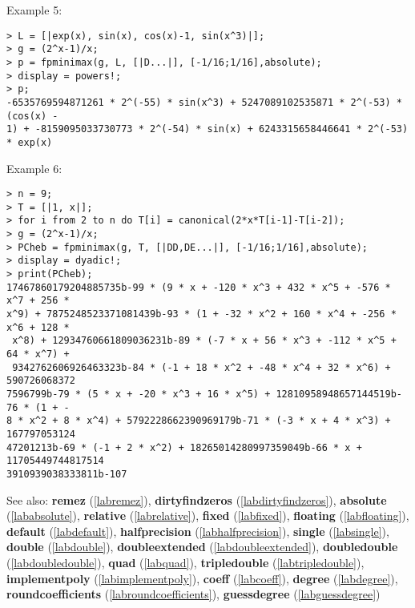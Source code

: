 \noindent Example 5: 
\begin{center}\begin{minipage}{15cm}\begin{Verbatim}[frame=single]
> L = [|exp(x), sin(x), cos(x)-1, sin(x^3)|];
> g = (2^x-1)/x;
> p = fpminimax(g, L, [|D...|], [-1/16;1/16],absolute);
> display = powers!;
> p;
-6535769594871261 * 2^(-55) * sin(x^3) + 5247089102535871 * 2^(-53) * (cos(x) - 
1) + -8159095033730773 * 2^(-54) * sin(x) + 6243315658446641 * 2^(-53) * exp(x)
\end{Verbatim}
\end{minipage}\end{center}
\noindent Example 6: 
\begin{center}\begin{minipage}{15cm}\begin{Verbatim}[frame=single]
> n = 9;
> T = [|1, x|];
> for i from 2 to n do T[i] = canonical(2*x*T[i-1]-T[i-2]);
> g = (2^x-1)/x;
> PCheb = fpminimax(g, T, [|DD,DE...|], [-1/16;1/16],absolute);
> display = dyadic!;
> print(PCheb);
17467860179204885735b-99 * (9 * x + -120 * x^3 + 432 * x^5 + -576 * x^7 + 256 * 
x^9) + 7875248523371081439b-93 * (1 + -32 * x^2 + 160 * x^4 + -256 * x^6 + 128 *
 x^8) + 12934760661809036231b-89 * (-7 * x + 56 * x^3 + -112 * x^5 + 64 * x^7) +
 9342762606926463323b-84 * (-1 + 18 * x^2 + -48 * x^4 + 32 * x^6) + 590726068372
7596799b-79 * (5 * x + -20 * x^3 + 16 * x^5) + 12810958948657144519b-76 * (1 + -
8 * x^2 + 8 * x^4) + 5792228662390969179b-71 * (-3 * x + 4 * x^3) + 167797053124
47201213b-69 * (-1 + 2 * x^2) + 18265014280997359049b-66 * x + 11705449744817514
3910939038333811b-107
\end{Verbatim}
\end{minipage}\end{center}
See also: \textbf{remez} (\ref{labremez}), \textbf{dirtyfindzeros} (\ref{labdirtyfindzeros}), \textbf{absolute} (\ref{lababsolute}), \textbf{relative} (\ref{labrelative}), \textbf{fixed} (\ref{labfixed}), \textbf{floating} (\ref{labfloating}), \textbf{default} (\ref{labdefault}), \textbf{halfprecision} (\ref{labhalfprecision}), \textbf{single} (\ref{labsingle}), \textbf{double} (\ref{labdouble}), \textbf{doubleextended} (\ref{labdoubleextended}), \textbf{doubledouble} (\ref{labdoubledouble}), \textbf{quad} (\ref{labquad}), \textbf{tripledouble} (\ref{labtripledouble}), \textbf{implementpoly} (\ref{labimplementpoly}), \textbf{coeff} (\ref{labcoeff}), \textbf{degree} (\ref{labdegree}), \textbf{roundcoefficients} (\ref{labroundcoefficients}), \textbf{guessdegree} (\ref{labguessdegree})
